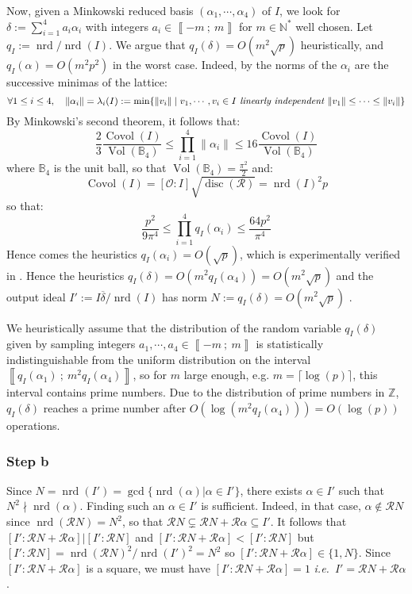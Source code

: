 \documentclass[a4paper,10pt]{report}
\theoremstyle{definition}
\theoremstyle{plain}
\theoremstyle{definition}
\newcommand{\ie}{\emph{i.e.}\ }
\newcommand{\N}{\mathbb{N}}
\newcommand{\Z}{\mathbb{Z}}
\newcommand{\B}{\mathbb{B}}
\newcommand{\m}[1]{\mathcal{#1}}
\newcommand{\mO}{\mathcal{O}}
\renewcommand{\i}[2]{\left\llbracket #1~;~#2\right\rrbracket}
\renewcommand{\(}{\left(}
\renewcommand{\)}{\right)}
\DeclareMathOperator{\disc}{disc}
\DeclareMathOperator{\nrd}{nrd}
\DeclareMathOperator{\Vol}{Vol}
\DeclareMathOperator{\Covol}{Covol}
\begin{document}
Now, given a Minkowski reduced basis $(\alpha_1, \cdots, \alpha_4)$ of $I$, we look for $\delta:=\sum_{i=1}^4 a_i\alpha_i$ with integers $a_i\in\i{-m}{m}$ for $m\in\N^*$ well chosen.  Let $q_I:=\nrd/\nrd(I)$. We argue that $q_I(\delta)=O(m^2\sqrt{p})$ heuristically, and $q_I(\alpha)=O(m^2p^2)$ in the worst case.  Indeed, by \cite[Teil I.  § 7]{VDW}
the norms of the $\alpha_i$ are the successive minimas of the lattice:
\[\forall 1\leq i\leq 4, \quad \|\alpha_i\|=\lambda_i(I):=\min\{\|v_i\|\mid v_1, \cdots, v_i\in I \emph{ linearly independent } \|v_1\|\leq\cdots\leq\|v_i\|\}\]
By Minkowski's second theorem, it follows that:
\[\frac{2}{3}\frac{\Covol(I)}{\Vol(\B_4)}\leq \prod_{i=1}^4\|\alpha_i\|\leq 16\frac{\Covol(I)}{\Vol(\B_4)}\]
where $\B_4$ is the unit ball, so that $\Vol(\B_4)=\frac{\pi^2}{2}$ and:
\[\Covol(I)=[\mO:I]\sqrt{\disc(\m{R})}=\nrd(I)^2p\]
so that:
\[\frac{p^2}{9\pi^4}\leq \prod_{i=1}^4q_I(\alpha_i)\leq \frac{64p^2}{\pi^4}\]
Hence comes the heuristics $q_I(\alpha_i)=O(\sqrt{p})$, which is experimentally verified in \cite{KLPT}. Hence the heuristics $q_I(\delta)=O(m^2q_I(\alpha_4))=O(m^2\sqrt{p})$ and the output ideal $I':=I\overline{\delta}/\nrd(I)$ has norm $N:=q_I(\delta)=O(m^2\sqrt{p})$ .


We heuristically assume that the distribution of the random variable $q_I(\delta)$ given by sampling integers $a_1,\cdots,a_4\in\i{-m}{m}$ is statistically indistinguishable from the uniform distribution on the interval $\i{q_I(\alpha_1)}{m^2 q_I(\alpha_4)}$, so for $m$ large enough, e.g. $m=\lceil \log(p)\rceil$, this interval contains prime numbers. Due to the distribution of prime numbers in $\Z$, $q_I(\delta)$ reaches a prime number after $O(\log(m^2 q_I(\alpha_4)))=O(\log(p))$ operations. 

\subsubsection{Step b}

Since $N=\nrd(I')=\gcd\{\nrd(\alpha)|\alpha\in I'\}$, there exists $\alpha\in I'$ such that $N^2\nmid\nrd(\alpha)$. Finding such an $\alpha\in I'$ is sufficient. Indeed, in that case, $\alpha\not\in \m{R}N$ since $\nrd(\m{R}N)=N^2$, so that $\m{R}N\subsetneq \m{R}N+\m{R}\alpha\subseteq I'$. It follows that $[I':\m{R}N+\m{R}\alpha]|[I':\m{R}N]$ and $[I':\m{R}N+\m{R}\alpha]<[I':\m{R}N]$ but $[I':\m{R}N]=\nrd(\m{R}N)^2/\nrd(I')^2=N^2$ so $[I':\m{R}N+\m{R}\alpha]\in \{1,N\}$. Since $[I':\m{R}N+\m{R}\alpha]$ is a square, we must have $[I':\m{R}N+\m{R}\alpha]=1$ \ie $I'=\m{R}N+\m{R}\alpha$.
\end{document}
